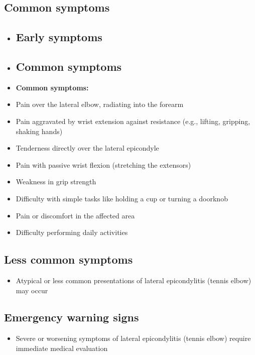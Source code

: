 \subsection{Common symptoms}
\begin{itemize}[noitemsep]
  \item \subsection{Early symptoms}
  \item \subsection{Common symptoms}
  \item \textbf{Common symptoms:}
  \item Pain over the lateral elbow, radiating into the forearm
  \item Pain aggravated by wrist extension against resistance (e.g., lifting, gripping, shaking hands)
  \item Tenderness directly over the lateral epicondyle
  \item Pain with passive wrist flexion (stretching the extensors)
  \item Weakness in grip strength
  \item Difficulty with simple tasks like holding a cup or turning a doorknob
  \item Pain or discomfort in the affected area
  \item Difficulty performing daily activities
\end{itemize}

\subsection{Less common symptoms}
\begin{itemize}[noitemsep]
  \item Atypical or less common presentations of lateral epicondylitis (tennis elbow) may occur
\end{itemize}

\subsection{Emergency warning signs}
\begin{itemize}[noitemsep]
  \item Severe or worsening symptoms of lateral epicondylitis (tennis elbow) require immediate medical evaluation
\end{itemize}
